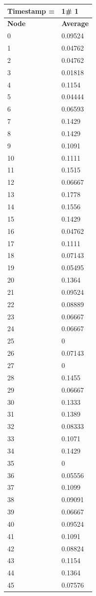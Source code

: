 \begin{tabular}{|l||l|}
\hline
\textbf{Timestamp =} & \textbf{1}\# 1\\\hline
	\textbf{Node} & \textbf{Average} \\ \hline
\hline
	0 & 0.09524 \\ \hline
	1 & 0.04762 \\ \hline
	2 & 0.04762 \\ \hline
	3 & 0.01818 \\ \hline
	4 & 0.1154 \\ \hline
	5 & 0.04444 \\ \hline
	6 & 0.06593 \\ \hline
	7 & 0.1429 \\ \hline
	8 & 0.1429 \\ \hline
	9 & 0.1091 \\ \hline
	10 & 0.1111 \\ \hline
	11 & 0.1515 \\ \hline
	12 & 0.06667 \\ \hline
	13 & 0.1778 \\ \hline
	14 & 0.1556 \\ \hline
	15 & 0.1429 \\ \hline
	16 & 0.04762 \\ \hline
	17 & 0.1111 \\ \hline
	18 & 0.07143 \\ \hline
	19 & 0.05495 \\ \hline
	20 & 0.1364 \\ \hline
	21 & 0.09524 \\ \hline
	22 & 0.08889 \\ \hline
	23 & 0.06667 \\ \hline
	24 & 0.06667 \\ \hline
	25 & 0 \\ \hline
	26 & 0.07143 \\ \hline
	27 & 0 \\ \hline
	28 & 0.1455 \\ \hline
	29 & 0.06667 \\ \hline
	30 & 0.1333 \\ \hline
	31 & 0.1389 \\ \hline
	32 & 0.08333 \\ \hline
	33 & 0.1071 \\ \hline
	34 & 0.1429 \\ \hline
	35 & 0 \\ \hline
	36 & 0.05556 \\ \hline
	37 & 0.1099 \\ \hline
	38 & 0.09091 \\ \hline
	39 & 0.06667 \\ \hline
	40 & 0.09524 \\ \hline
	41 & 0.1091 \\ \hline
	42 & 0.08824 \\ \hline
	43 & 0.1154 \\ \hline
	44 & 0.1364 \\ \hline
	45 & 0.07576 \\ \hline
\end{tabular}

